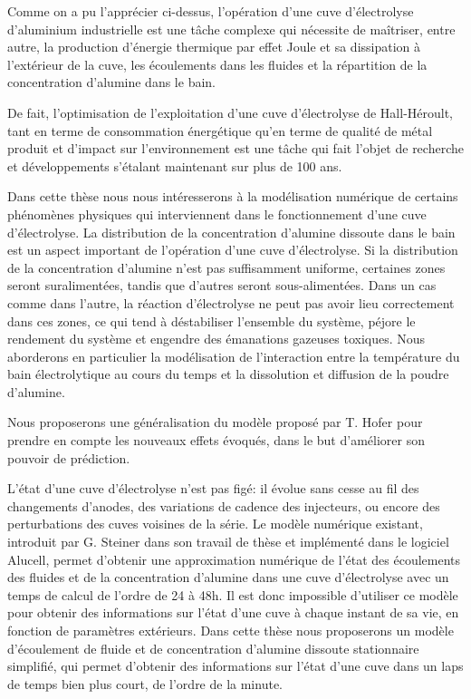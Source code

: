 Comme on a pu l'apprécier ci-dessus, l'opération d'une cuve
d'électrolyse d'aluminium industrielle est une tâche complexe qui
nécessite de maîtriser, entre autre, la production d'énergie thermique
par effet Joule et sa dissipation à l'extérieur de la cuve, les
écoulements dans les fluides et la répartition de la concentration
d'alumine dans le bain.

De fait, l'optimisation de l'exploitation d'une cuve d'électrolyse de
Hall-Héroult, tant en terme de consommation énergétique qu'en terme de
qualité de métal produit et d'impact sur l'environnement est une tâche
qui fait l'objet de recherche et développements s'étalant maintenant
sur plus de 100 ans.

Dans cette thèse nous nous intéresserons à la modélisation numérique
de certains phénomènes physiques qui interviennent dans le
fonctionnement d'une cuve d'électrolyse. La distribution de la
concentration d'alumine dissoute dans le bain est un aspect important
de l'opération d'une cuve d'électrolyse. Si la distribution de la
concentration d'alumine n'est pas suffisamment uniforme, certaines
zones seront suralimentées, tandis que d'autres seront
sous-alimentées. Dans un cas comme dans l'autre, la réaction
d'électrolyse ne peut pas avoir lieu correctement dans ces zones, ce
qui tend à déstabiliser l'ensemble du système, péjore le rendement du
système et engendre des émanations gazeuses toxiques. Nous aborderons
en particulier la modélisation de l'interaction entre la température
du bain électrolytique au cours du temps et la dissolution et
diffusion de la poudre d'alumine.

Nous proposerons une généralisation du modèle proposé par
T. Hofer \cite{Hofer2011} pour prendre en compte les nouveaux effets
évoqués, dans le but d'améliorer son pouvoir de prédiction.

L'état d'une cuve d'électrolyse n'est pas figé: il évolue sans cesse
au fil des changements d'anodes, des variations de cadence des
injecteurs, ou encore des perturbations des cuves voisines de la
série. Le modèle numérique existant, introduit par G. Steiner dans son
travail de thèse \cite{Steiner2009} et implémenté dans le logiciel
Alucell, permet d'obtenir une approximation numérique de l'état des
écoulements des fluides et de la concentration d'alumine dans une cuve
d'électrolyse avec un temps de calcul de l'ordre de \num{24} à
\num{48}\si{\hour}. Il est donc impossible d'utiliser ce modèle pour
obtenir des informations sur l'état d'une cuve à chaque instant de sa
vie, en fonction de paramètres extérieurs. Dans cette thèse nous
proposerons un modèle d'écoulement de fluide et de concentration
d'alumine dissoute stationnaire simplifié, qui permet d'obtenir des
informations sur l'état d'une cuve dans un laps de temps bien plus
court, de l'ordre de la minute.

